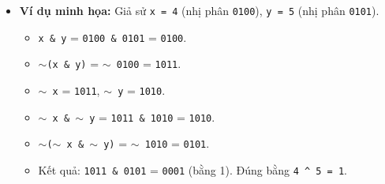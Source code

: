 \documentclass[12pt, a4paper]{article}
\begin{document}
\begin{itemize}
\begin{minipage}{\linewidth}
\begin{lstlisting}[language=C]
int bitXor(int x, int y) {
  // ~(x & y): Nhung bit KHONG DONG THOI bang 1 o ca x va y
  // ~(~x & ~y): Nhung bit KHONG DONG THOI bang 0 o ca x va y
  // AND hai gia tri nay lai ta se giu duoc nhung bit ma x va y khac nhau.
  return ~(x & y) & ~(~x & ~y);
}
\end{lstlisting}
\end{minipage}
    \item \textbf{Ví dụ minh họa:}
    Giả sử \texttt{x = 4} (nhị phân \texttt{0100}), \texttt{y = 5} (nhị phân \texttt{0101}).
    \begin{itemize}
        \item \texttt{x \& y} = \texttt{0100 \& 0101} = \texttt{0100}.
        \item \texttt{\(\sim\)(x \& y)} = \texttt{\(\sim\) 0100} = \texttt{1011}.
        \item \texttt{\(\sim\) x} = \texttt{1011}, \texttt{\(\sim\) y} = \texttt{1010}.
        \item \texttt{\(\sim\) x \& \(\sim\) y} = \texttt{1011 \& 1010} = \texttt{1010}.
        \item \texttt{\(\sim\)(\(\sim\) x \& \(\sim\) y)} = \texttt{\(\sim\) 1010} = \texttt{0101}.
        \item Kết quả: \texttt{1011 \& 0101} = \texttt{0001} (bằng 1). Đúng bằng \texttt{4 \textasciicircum\ 5 = 1}.
    \end{itemize}
\end{itemize}

\newpage
\end{document}
